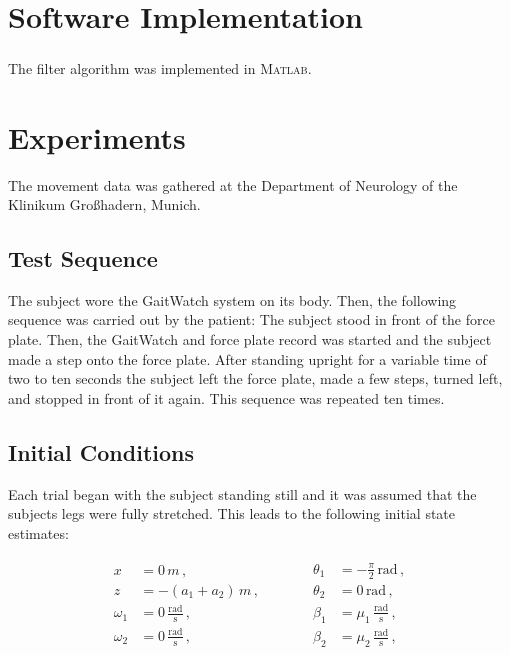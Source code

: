 \section{Software Implementation}

The filter algorithm was implemented in \textsc{Matlab}\textsuperscript{\textregistered}.

\section{Experiments}

The movement data was gathered at the Department of Neurology of the Klinikum Großhadern, Munich.

\subsection{Test Sequence}

The subject wore the GaitWatch system on its body. Then, the following sequence was carried out by the patient: The subject stood in front of the force plate. Then, the GaitWatch and force plate record was started and the subject made a step onto the force plate. After standing upright for a variable time of two to ten seconds the subject left the force plate, made a few steps, turned left, and stopped in front of it again. This sequence was repeated ten times.

\subsection{Initial Conditions}

Each trial began with the subject standing still and it was assumed that the subjects legs were fully stretched. This leads to the following initial state estimates:

\begin{equation}
\begin{matrix}
	\begin{split}
	  x &= 0\,m\,, \\
	  z &= -(a_1+a_2)\,m\,, \\
	  \omega_1 &= 0\,\frac{\mbox{rad}}{\mbox{s}}\,, \\
	  \omega_2 &= 0\,\frac{\mbox{rad}}{\mbox{s}}\,,
\end{split} \qquad \quad
    \begin{split}
	  \theta_1 &= -\frac{\pi}{2}\,\mbox{rad}\,, \\
	  \theta_2 &= 0\,\mbox{rad}\,, \\
	  \beta_1 &= \mu_1\,\frac{\mbox{rad}}{\mbox{s}}\,, \\
	  \beta_2 &= \mu_2\,\frac{\mbox{rad}}{\mbox{s}}\,,  
\end{split}
\end{matrix}
\end{equation}

